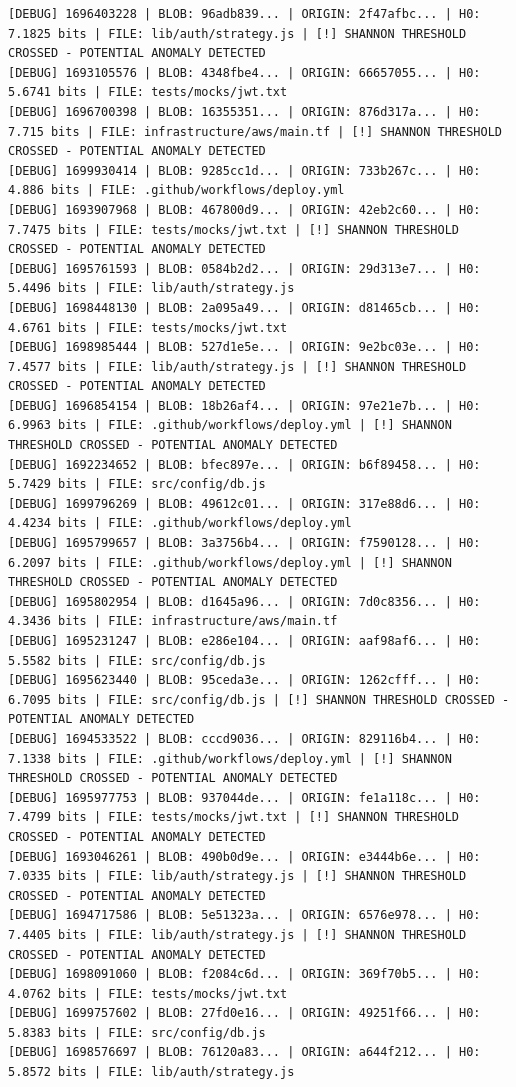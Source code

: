 \documentclass[12pt, a4paper, oneside]{report}
\begin{document}
\begin{lstlisting}[basicstyle=\tiny\ttfamily]
[DEBUG] 1696403228 | BLOB: 96adb839... | ORIGIN: 2f47afbc... | H0: 7.1825 bits | FILE: lib/auth/strategy.js | [!] SHANNON THRESHOLD CROSSED - POTENTIAL ANOMALY DETECTED
[DEBUG] 1693105576 | BLOB: 4348fbe4... | ORIGIN: 66657055... | H0: 5.6741 bits | FILE: tests/mocks/jwt.txt
[DEBUG] 1696700398 | BLOB: 16355351... | ORIGIN: 876d317a... | H0: 7.715 bits | FILE: infrastructure/aws/main.tf | [!] SHANNON THRESHOLD CROSSED - POTENTIAL ANOMALY DETECTED
[DEBUG] 1699930414 | BLOB: 9285cc1d... | ORIGIN: 733b267c... | H0: 4.886 bits | FILE: .github/workflows/deploy.yml
[DEBUG] 1693907968 | BLOB: 467800d9... | ORIGIN: 42eb2c60... | H0: 7.7475 bits | FILE: tests/mocks/jwt.txt | [!] SHANNON THRESHOLD CROSSED - POTENTIAL ANOMALY DETECTED
[DEBUG] 1695761593 | BLOB: 0584b2d2... | ORIGIN: 29d313e7... | H0: 5.4496 bits | FILE: lib/auth/strategy.js
[DEBUG] 1698448130 | BLOB: 2a095a49... | ORIGIN: d81465cb... | H0: 4.6761 bits | FILE: tests/mocks/jwt.txt
[DEBUG] 1698985444 | BLOB: 527d1e5e... | ORIGIN: 9e2bc03e... | H0: 7.4577 bits | FILE: lib/auth/strategy.js | [!] SHANNON THRESHOLD CROSSED - POTENTIAL ANOMALY DETECTED
[DEBUG] 1696854154 | BLOB: 18b26af4... | ORIGIN: 97e21e7b... | H0: 6.9963 bits | FILE: .github/workflows/deploy.yml | [!] SHANNON THRESHOLD CROSSED - POTENTIAL ANOMALY DETECTED
[DEBUG] 1692234652 | BLOB: bfec897e... | ORIGIN: b6f89458... | H0: 5.7429 bits | FILE: src/config/db.js
[DEBUG] 1699796269 | BLOB: 49612c01... | ORIGIN: 317e88d6... | H0: 4.4234 bits | FILE: .github/workflows/deploy.yml
[DEBUG] 1695799657 | BLOB: 3a3756b4... | ORIGIN: f7590128... | H0: 6.2097 bits | FILE: .github/workflows/deploy.yml | [!] SHANNON THRESHOLD CROSSED - POTENTIAL ANOMALY DETECTED
[DEBUG] 1695802954 | BLOB: d1645a96... | ORIGIN: 7d0c8356... | H0: 4.3436 bits | FILE: infrastructure/aws/main.tf
[DEBUG] 1695231247 | BLOB: e286e104... | ORIGIN: aaf98af6... | H0: 5.5582 bits | FILE: src/config/db.js
[DEBUG] 1695623440 | BLOB: 95ceda3e... | ORIGIN: 1262cfff... | H0: 6.7095 bits | FILE: src/config/db.js | [!] SHANNON THRESHOLD CROSSED - POTENTIAL ANOMALY DETECTED
[DEBUG] 1694533522 | BLOB: cccd9036... | ORIGIN: 829116b4... | H0: 7.1338 bits | FILE: .github/workflows/deploy.yml | [!] SHANNON THRESHOLD CROSSED - POTENTIAL ANOMALY DETECTED
[DEBUG] 1695977753 | BLOB: 937044de... | ORIGIN: fe1a118c... | H0: 7.4799 bits | FILE: tests/mocks/jwt.txt | [!] SHANNON THRESHOLD CROSSED - POTENTIAL ANOMALY DETECTED
[DEBUG] 1693046261 | BLOB: 490b0d9e... | ORIGIN: e3444b6e... | H0: 7.0335 bits | FILE: lib/auth/strategy.js | [!] SHANNON THRESHOLD CROSSED - POTENTIAL ANOMALY DETECTED
[DEBUG] 1694717586 | BLOB: 5e51323a... | ORIGIN: 6576e978... | H0: 7.4405 bits | FILE: lib/auth/strategy.js | [!] SHANNON THRESHOLD CROSSED - POTENTIAL ANOMALY DETECTED
[DEBUG] 1698091060 | BLOB: f2084c6d... | ORIGIN: 369f70b5... | H0: 4.0762 bits | FILE: tests/mocks/jwt.txt
[DEBUG] 1699757602 | BLOB: 27fd0e16... | ORIGIN: 49251f66... | H0: 5.8383 bits | FILE: src/config/db.js
[DEBUG] 1698576697 | BLOB: 76120a83... | ORIGIN: a644f212... | H0: 5.8572 bits | FILE: lib/auth/strategy.js
\end{lstlisting}
\end{document}
